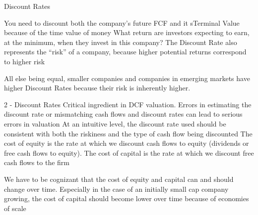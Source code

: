 \documentclass[10pt]{article}
\begin{document}
    \begin{core}{Discount Rates}

      You need to discount both the company’s future FCF and it sTerminal Value because of the time value of money
      What return are investors expecting to earn, at the minimum, when they invest in this company?
      The Discount Rate also represents the “risk” of a company, because higher potential returns correspond to higher risk

      All else being equal, smaller companies and companies in emerging markets have higher Discount Rates because their risk is inherently higher.

      2 - Discount Rates
      Critical ingredient in DCF valuation. Errors in estimating the discount rate or mismatching cash flows and discount rates can lead to serious errors in valuation
      At an intuitive level, the discount rate used should be consistent with both the riskiness and the type of cash flow being discounted
      The cost of equity is the rate at which we discount cash flows to equity (dividends or free cash flows to equity). The cost of capital is the rate at which we discount free cash flows to the firm

      We have to be cognizant that the cost of equity and capital can and should change over time. Especially in the case of an initially small cap company growing, the cost of capital should become lower over time because of economies of scale

    \end{core}
\end{document}
